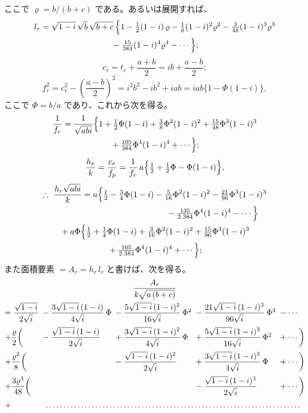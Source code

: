 \documentclass[11pt]{article}
\newcommand{\scanpage}[2]{\clearpage\setcounter{footnote}{0}\noindent{\footnotesize\color{gray}PDF #1 頁 · #2}\par\medskip}
\begin{document}
\scanpage{0327}{印刷頁 313}
\noindent ここで $\varrho = b/(b + c)$ である。あるいは展開すれば、
\begin{multline*}
l_r = \sqrt{1 - i}\,\sqrt{b}\,\sqrt{b + c}\,\Bigl\{1 - \tfrac{1}{2}(1 - i)\,\varrho - \tfrac{1}{8}(1 - i)^2\varrho^2 - \tfrac{3}{48}(1 - i)^3\varrho^3\\
{} - \tfrac{15}{384}(1 - i)^4\varrho^4 - \cdots\Bigr\};
\end{multline*}
\[
c_r = t_r + \frac{a + b}{2} = ib + \frac{a - b}{2};
\]
\[
f_r^2 = c_r^2 - \left(\frac{a - b}{2}\right)^2 = i^2b^2 - ib^2 + iab = iab\{1 - \Phi(1 - i)\},
\]
ここで $\Phi = b/a$ であり、これから次を得る。
\begin{multline*}
\frac{1}{f_r} = \frac{1}{\sqrt{abi}}\Bigl\{1 + \tfrac{1}{2}\Phi(1 - i) + \tfrac{3}{8}\Phi^2(1 - i)^2 + \tfrac{15}{48}\Phi^3(1 - i)^3\\
{} + \tfrac{105}{384}\Phi^4(1 - i)^4 + \cdots\Bigr\};
\end{multline*}
\[
\frac{h_r}{k} = \frac{c_r}{f_p} = \frac{1}{f_r}\,a\Bigl\{\tfrac{1}{2} + \tfrac{1}{2}\Phi - \Phi(1 - i)\Bigr\},
\]
\begin{multline*}
\therefore\ \frac{h_r\sqrt{abi}}{k} = a\Bigl\{\tfrac{1}{2} - \tfrac{3}{4}\Phi(1 - i) - \tfrac{5}{16}\Phi^2(1 - i)^2 - \tfrac{21}{96}\Phi^3(1 - i)^3\\
\shoveright{{} - \tfrac{135}{2.384}\Phi^4(1 - i)^4 - \cdots\Bigr\}}\\
{} + a\Phi\Bigl\{\tfrac{1}{2} + \tfrac{1}{4}\Phi(1 - i) + \tfrac{3}{16}\Phi^2(1 - i)^2 + \tfrac{15}{96}\Phi^3(1 - i)^3\\
{} + \tfrac{105}{2.384}\Phi^4(1 - i)^4 + \cdots\Bigr\};
\end{multline*}
また面積要素 $= A_r = h_r\,l_r$ と書けば、次を得る。
\[
\begin{array}{@{}l@{\;}l@{\;}l@{\;}l@{\;}l@{}}
\multicolumn{5}{c}{\dfrac{A_r}{k\sqrt{a\,(b + c)}}}\\[4mm]
= \dfrac{\sqrt{1 - i}}{2\sqrt{i}}
 & {} - \dfrac{3\sqrt{1 - i}\,(1 - i)}{4\sqrt{i}}\,\Phi
 & {} - \dfrac{5\sqrt{1 - i}\,(1 - i)^2}{16\sqrt{i}}\,\Phi^2
 & {} - \dfrac{21\sqrt{1 - i}\,(1 - i)^3}{96\sqrt{i}}\,\Phi^3
 & {} - \cdots\\[4mm]
+ \dfrac{\varrho}{2}\biggl(
 & {} - \dfrac{\sqrt{1 - i}\,(1 - i)}{2\sqrt{i}}
 & {} + \dfrac{3\sqrt{1 - i}\,(1 - i)^2}{4\sqrt{i}}\,\Phi
 & {} + \dfrac{5\sqrt{1 - i}\,(1 - i)^3}{16\sqrt{i}}\,\Phi^2
 & {} + \cdots\biggr)\\[4mm]
+ \dfrac{\varrho^2}{8}\biggl(
 &
 & {} - \dfrac{\sqrt{1 - i}\,(1 - i)^2}{2\sqrt{i}}
 & {} + \dfrac{3\sqrt{1 - i}\,(1 - i)^3}{4\sqrt{i}}\,\Phi
 & {} + \cdots\biggr)\\[4mm]
+ \dfrac{3\varrho^3}{48}\biggl(
 &
 &
 & {} - \dfrac{\sqrt{1 - i}\,(1 - i)^3}{2\sqrt{i}}
 & {} + \cdots\biggr)\\[4mm]
+ & \multicolumn{4}{l}{\dotfill}
\end{array}
\]
\end{document}
